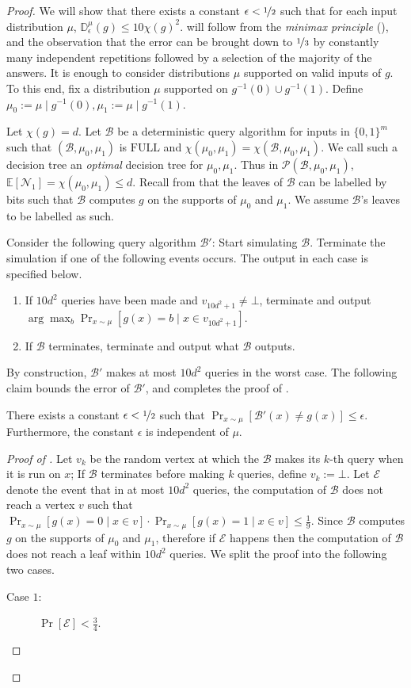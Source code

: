 \documentclass{toc}
\newcommand{\dr}{\nicefrac}
\newcommand{\eps}{\epsilon}
\newcommand{\D}{\mathbb{D}}
\newcommand{\full}{\text{FULL}}
\newcommand{\clB}{\mathcal{B}}
\newcommand{\clE}{\mathcal{E}}
\newcommand{\clP}{\mathcal{P}}
\newcommand{\clN}{\mathcal{N}}
\newcommand{\E}{\mathbb{E}}
\begin{document}
\begin{proof}
\label{hibias}
We will show that there exists a constant $\eps < \dr12$ such that for each input distribution $\mu$, $\D_{\eps}^\mu (g)  \leq 10\chi(g)^2$.  will follow from the \emph{minimax principle} (), and the observation that the error can be brought down to $\dr13$ by constantly many independent repetitions followed by a selection of the majority of the answers. It is enough to consider distributions $\mu$ supported on valid inputs of $g$. To this end, fix a distribution $\mu$ supported on $g^{-1}(0) \cup g^{-1}(1)$. Define $\mu_0:=\mu \mid g^{-1}(0), \mu_1:=\mu \mid g^{-1}(1)$.

Let $\chi(g)=d$. Let $\clB$ be a deterministic query algorithm for inputs in $\{0,1\}^m$ such that $(\clB, \mu_0, \mu_1)$ is $\full$ and $\chi(\mu_0, \mu_1)=\chi(\clB, \mu_0, \mu_1)$. We call such a decision tree an \emph{optimal} decision tree for $\mu_0, \mu_1$. Thus in $\clP(\clB, \mu_0, \mu_1)$, $\E[\clN_1] = \chi(\mu_0, \mu_1) \leq d$. Recall from  that the leaves of $\clB$ can be labelled by bits such that $\clB$ computes $g$ on the supports of $\mu_0$ and $\mu_1$. We assume $\clB$'s leaves to be labelled as such.

Consider the following query algorithm $\clB'$: Start simulating $\clB$. Terminate the simulation if one of the following events occurs. The output in each case is specified below.
\begin{enumerate}
\item If $10d^2$ queries have been made and $v_{10d^2+1}\neq \bot$, terminate and output $\arg \max_b \Pr_{x \sim \mu}[g(x)=b \mid x \in v_{10d^2+1}]$. \label{e2}
\item If $\clB$ terminates, terminate and output what $\clB$ outputs. \label{e1}
\end{enumerate}
By construction, $\clB'$ makes at most $10d^2$ queries in the worst case. The following claim bounds the error of $\clB'$, and completes the proof of .
\begin{claim}
\label{runtime}
There exists a constant $\eps < \dr12$ such that $\Pr_{x \sim \mu}[\clB'(x)\neq g(x)] \leq \eps$. Furthermore, the constant $\eps$ is independent of $\mu$.
\end{claim}
\begin{proof}[Proof of {}]
Let $v_k$ be the random vertex at which the $\clB$ makes its $k$-th query when it is run on $x$; If $\clB$ terminates before making $k$ queries, define $v_k:=\bot$. Let $\clE$ denote the event that in at most $10d^2$ queries, the computation of $\clB$ does not reach a vertex $v$ such that $\Pr_{x \sim \mu}[g(x)=0 \mid x \in v]\cdot\Pr_{x \sim \mu}[g(x)=1 \mid x \in v] \leq \frac{1}{9}$. Since $\clB$ computes $g$ on the supports of $\mu_0$ and $\mu_1$, therefore if $\clE$ happens then the computation of $\clB$ does not reach a leaf within $10d^2$ queries. We split the proof into the following two cases.
\begin{description}
\item [Case $1$:] $\Pr[\clE] < \frac{3}{4}$.


\end{description}
\end{proof}
\end{proof}
\end{document}
